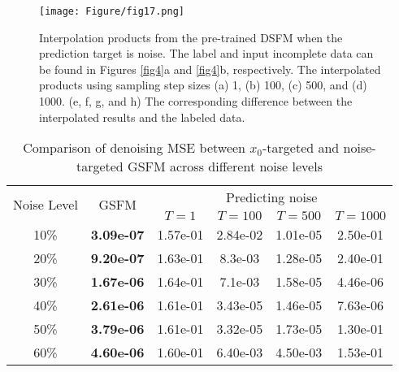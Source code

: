 \begin{figure*}[htbp]
\centering
\texttt{[image: Figure/fig17.png]}
\caption{Interpolation products from the pre-trained DSFM when the prediction target is noise. The label and input incomplete data can be found in Figures \ref{fig4}a and \ref{fig4}b, respectively. The interpolated products using sampling step sizes (a) 1, (b) 100, (c) 500, and (d) 1000. (e, f, g, and h) The corresponding difference between the interpolated results and the labeled data.}
\label{fig17}
\end{figure*}

\begin{table}[htbp]
    \centering
    \caption{Comparison of denoising MSE between $x_0$-targeted and noise-targeted GSFM across different noise levels}
    \label{tab4}
    \begin{tabular}{@{} c c c c c c @{}}
        \toprule
        \multirow{2}{*}{Noise Level} & \multirow{2}{*}{GSFM} & \multicolumn{4}{c}{Predicting noise} \\ \cmidrule(lr){3-6} 
         &  & $T=1$ & $T=100$ & $T=500$ & $T=1000$ \\ 
        \midrule
        10\% & \textbf{3.09e-07} & 1.57e-01 & 2.84e-02 & 1.01e-05 & 2.50e-01 \\
        20\% & \textbf{9.20e-07} & 1.63e-01 & 8.3e-03  & 1.28e-05 & 2.40e-01 \\
        30\% & \textbf{1.67e-06} & 1.64e-01 & 7.1e-03  & 1.58e-05 & 4.46e-06 \\
        40\% & \textbf{2.61e-06} & 1.61e-01 & 3.43e-05 & 1.46e-05 & 7.63e-06 \\
        50\% & \textbf{3.79e-06} & 1.61e-01 & 3.32e-05 & 1.73e-05 & 1.30e-01 \\
        60\% & \textbf{4.60e-06} & 1.60e-01 & 6.40e-03 & 4.50e-03 & 1.53e-01 \\
        \bottomrule
    \end{tabular}
\end{table}


